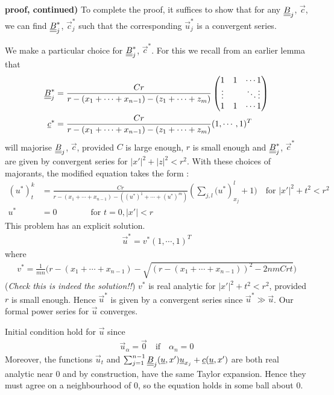 \documentclass[12pt,a4paper]{report}
\newenvironment{proof}
{\begin{changemargin}{1cm}{0.5cm} 
	}%
	{\end{changemargin}
}
\begin{document}
\begin{proof}
\textbf{proof, continued)} To complete the proof, it suffices to show that for any $\underline{\underline{B}}_j$, $\vec{c}$, we can find $\underline{\underline{B}}^*_j$, $\vec{c}^*_j$ such that the corresponding $\vec{u}^*_j$ is a convergent series.

\quad We make a particular choice for $\underline{\underline{B}}^*_j$, $\vec{c}^*$. For this we recall from an earlier lemma that
\begin{align*}
\underline{\underline{B}}^*_j &= \frac{Cr}{r-(x_1+\cdots+x_{n-1}) - (z_1 + \cdots + z_m)} \begin{pmatrix}
1 & 1& \cdots 1 \\
\vdots & & \ddots \vdots \\
1 & 1 & \cdots 1
\end{pmatrix} \\
\underline{c}^* &= \frac{Cr}{r-(x_1+\cdots+x_{n-1}) - (z_1 + \cdots + z_m)} (1,\cdots, 1)^T
\end{align*}
will majorise $\underline{\underline{B}}_j$, $\vec{c}$, provided $C$ is large enough, $r$ is small enough and $\underline{\underline{B}}^*_j$, $\vec{c}^*$ are given by convergent series for $|x'|^2 + |z|^2 <r^2$. With these choices of majorants, the modified equation takes the form :
\begin{align*}
(u^*)^k_t  &= \frac{Cr}{r-(x_1+\cdots+x_{n-1}) - ((u^*)^1 + \cdots + (u^*)^m)} (\sum_{j,l} \big( u^*)^l_{x_j} +1 \big) \quad \text{for } |x'|^2 + t^2 <r^2 \\
u^* &= 0 \quad \quad \quad \quad \text{for } t=0,|x'|<r
\end{align*}
This problem has an explicit solution.
\begin{align*}
\vec{u}^* = v^* (1,\cdots,1)^T
\end{align*}
where
\begin{align*}
v^* = \frac{1}{mn} \Big( r - (x_1+ \cdots + x_{n-1}) - \sqrt{(r-(x_1+\cdots + x_{n-1}))^2 - 2nmCrt} \Big)
\end{align*}
(\emph{Check this is indeed the solution!!}) $v^*$ is real analytic for $|x'|^2 + t^2 < r^2$, provided $r$ is small enough. Hence $\vec{u}^*$ is given by a convergent series since $\vec{u}^* \gg \vec{u}$. Our formal power series for $\vec{u}$ converges.

\quad Initial condition hold for $\vec{u}$ since
\begin{align*}
\vec{u}_{\alpha} = \vec{0} \quad \text{if} \quad \alpha_n =0
\end{align*}
Moreover, the functions $\vec{u}_t$ and $\sum_{j=1}^{n-1} \underline{\underline{B}}_j(\underline{u},x') \underline{u}_{x_j} + \underline{c}(\underline{u},x')$ are both real analytic near 0 and by construction, have the same Taylor expansion. Hence they must agree on a neighbourhood of 0, so the equation holds in some ball about 0.

\eop 
\end{proof}
\s
\end{document}
